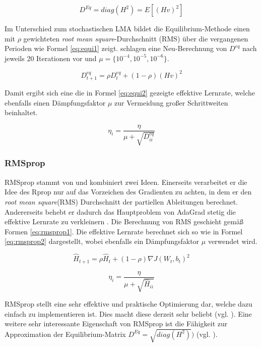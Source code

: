 \begin{equation}
\label{eq:equi} 
D^{Eq} = diag(H^2) = E[(Hv)^2]
\end{equation}

Im Unterschied zum stochastischen LMA bildet die Equilibrium-Methode einen mit $\rho$ gewichteten \textit{root mean square}-Durchschnitt (RMS) über die vergangenen Perioden wie Formel \ref{eq:equi1} zeigt. \cite{Dauphin2015} schlagen eine Neu-Berechnung von $D^{eq}$ nach jeweils 20 Iterationen vor und $\mu = \{10^{-4},10^{-5},10^{-6}\}$.

\begin{equation}
\label{eq:equi1} 
D^{eq}_{t+1} = \rho D^{eq}_{t} + (1 - \rho) (Hv)^2
\end{equation}

Damit ergibt sich eine die in Formel \ref{eq:equi2} gezeigte effektive Lernrate, welche ebenfalls einen Dämpfungsfaktor $\mu$ zur Vermeidung großer Schrittweiten beinhaltet.

\begin{equation}
\label{eq:equi2} 
\eta_{i} = \frac{\eta}{\mu + \sqrt{D^{eq}_{ii}}}
\end{equation}

\subsubsection{RMSprop}
RMSprop stammt von \cite{Hinton2015} und kombiniert zwei Ideen. Einerseits verarbeitet er die Idee des Rprop nur auf das Vorzeichen des Gradienten zu achten, in dem er den \textit{root mean square}(RMS) Durchschnitt der partiellen Ableitungen berechnet. Andererseits behebt er dadurch das Hauptproblem von AdaGrad stetig die effektive Lernrate zu verkleinern \cite[vgl.][Kap. 8.4.1, S. 257]{Bengio2015}. Die Berechnung von RMS geschieht gemäß Formen \ref{eq:rmsprop1}. Die effektive Lernrate berechnet sich so wie in Formel \ref{eq:rmsprop2} dargestellt, wobei ebenfalls ein Dämpfungsfaktor $\mu$ verwendet wird.

\begin{equation}
\label{eq:rmsprop1} 
\hat{H}_{t+1} = \rho \hat{H}_{t} + (1 - \rho) \nabla J(W_t,b_t)^2
\end{equation}


\begin{equation}
\label{eq:rmsprop2} 
\eta_{i} = \frac{\eta}{\mu + \sqrt{\hat{H}_{ii}}}
\end{equation}

RMSprop stellt eine sehr effektive und praktische Optimierung dar, welche dazu einfach zu implementieren ist. Dies macht diese derzeit sehr beliebt (vgl. \cite{Bengio2015}). Eine weitere sehr interessante Eigenschaft von RMSprop ist die Fähigkeit zur Approximation der Equilibrium-Matrix $D^{Eq} = \sqrt{diag(H^2)})$ (vgl. \cite{Dauphin2015}).

